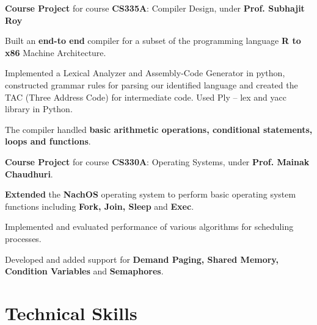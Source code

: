 \documentclass[a4paper]{norm-resume}
\begin{document}
    				
	\begin{tightitemize}
	\small
	{
	\item \textbf{Course Project} for course \textbf{CS335A}: Compiler Design, under \textbf{Prof. Subhajit Roy}
	\item Built an \textbf{end-to end} compiler for a subset of the programming language \textbf{R to x86} Machine Architecture. 
	\item Implemented a Lexical Analyzer and Assembly-Code Generator in python, constructed grammar rules for parsing our identified language and created the TAC (Three Address Code) for intermediate code. Used Ply – lex and yacc library in Python.
    \item The compiler handled \textbf{basic arithmetic operations, conditional statements, loops and functions}.
    }
	\end{tightitemize}
		
	\vspace{2mm}

	   \descript{July '15 - Nov '15}
	\begin{tightitemize}
	\small
	{
	\item \textbf{Course Project} for course \textbf{CS330A}: Operating Systems, under \textbf{Prof. Mainak Chaudhuri}.
	\item \textbf{Extended} the \textbf{NachOS} operating system to perform basic operating system functions including \textbf{Fork, Join, Sleep} and \textbf{Exec}. 
	\item Implemented and evaluated performance of various algorithms for scheduling processes.
	\item Developed and added support for \textbf{Demand Paging, Shared Memory, Condition Variables} and \textbf{Semaphores}.	
	}
	\end{tightitemize}	

\vspace{1mm}	%


\section{Technical Skills}

\vspace{1mm}	%

 \hfill {} \\
\vspace{1mm}	%
 \hfill {} \\
 \hfill {}
\vspace{2mm}	%
\end{document}
